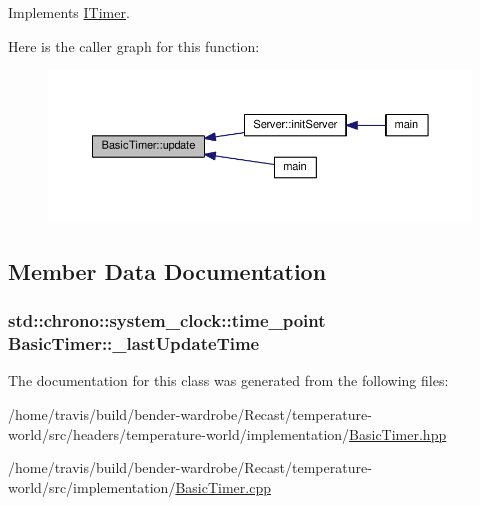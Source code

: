 Implements \hyperlink{class_i_timer_afa6c0d962817423715ce9f944f1b6a2c}{I\-Timer}.



Here is the caller graph for this function\-:
\nopagebreak
\begin{figure}[H]
\begin{center}
\leavevmode
\includegraphics[width=350pt]{class_basic_timer_abf76823ef1c782a0c6d49af2652b5271_icgraph}
\end{center}
\end{figure}




\subsection{Member Data Documentation}
\hypertarget{class_basic_timer_a1c5ab332f195b367d5fbf91183f4dc8a}{
\subsubsection[{\-\_\-last\-Update\-Time}]{\setlength{\rightskip}{0pt plus 5cm}std\-::chrono\-::system\-\_\-clock\-::time\-\_\-point Basic\-Timer\-::\-\_\-last\-Update\-Time\hspace{0.3cm}{\ttfamily [protected]}}}\label{class_basic_timer_a1c5ab332f195b367d5fbf91183f4dc8a}


The documentation for this class was generated from the following files\-:\begin{DoxyCompactItemize}
\item 
/home/travis/build/bender-\/wardrobe/\-Recast/temperature-\/world/src/headers/temperature-\/world/implementation/\hyperlink{_basic_timer_8hpp}{Basic\-Timer.\-hpp}\item 
/home/travis/build/bender-\/wardrobe/\-Recast/temperature-\/world/src/implementation/\hyperlink{_basic_timer_8cpp}{Basic\-Timer.\-cpp}\end{DoxyCompactItemize}
